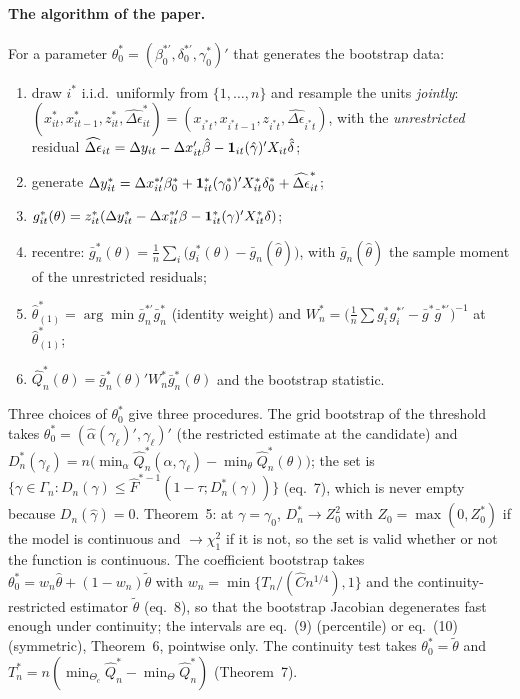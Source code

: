 \documentclass[
  10.5pt,
  a4paper,
]{article}
\begin{document}
\paragraph{The algorithm of the paper.} For a parameter $\theta^*_0=(\beta^{*\prime}_0,\delta^{*\prime}_0,\gamma^*_0)'$ that
generates the bootstrap data:
\begin{enumerate}
\item draw $i^*$ i.i.d.\ uniformly from $\{1,\dots,n\}$ and resample the units \emph{jointly}:
$(x^*_{it},x^*_{it-1},z^*_{it},\widehat{\Delta\epsilon}^*_{it})=(x_{i^*t},x_{i^*t-1},z_{i^*t},\widehat{\Delta\epsilon}_{i^*t})$,
with the \emph{unrestricted} residual $\widehat{\Delta\epsilon}_{it}=\Delta y_{it}-\Delta x_{it}'\hat\beta-\mathbf{1}_{it}(\hat\gamma)'X_{it}\hat\delta$;
\item generate $\Delta y^*_{it}=\Delta x^{*\prime}_{it}\beta^*_0+\mathbf{1}^*_{it}(\gamma^*_0)'X^*_{it}\delta^*_0+\widehat{\Delta\epsilon}^*_{it}$;
\item $g^*_{it}(\theta)=z^*_{it}(\Delta y^*_{it}-\Delta x^{*\prime}_{it}\beta-\mathbf{1}^*_{it}(\gamma)'X^*_{it}\delta)$;
\item recentre: $\bar g^*_n(\theta)=\frac1n\sum_i\bigl(g^*_i(\theta)-\bar g_n(\hat\theta)\bigr)$, with
$\bar g_n(\hat\theta)$ the sample moment of the unrestricted residuals;
\item $\hat\theta^*_{(1)}=\arg\min\bar g^{*\prime}_n\bar g^*_n$ (identity weight) and
$W^*_n=\bigl(\frac1n\sum g^*_ig^{*\prime}_i-\bar g^*\bar g^{*\prime}\bigr)^{-1}$ at $\hat\theta^*_{(1)}$;
\item $\hat Q^*_n(\theta)=\bar g^*_n(\theta)'W^*_n\bar g^*_n(\theta)$ and the bootstrap statistic.
\end{enumerate}
Three choices of $\theta^*_0$ give three procedures. The grid bootstrap of the threshold takes
$\theta^*_0=(\hat\alpha(\gamma_\ell)',\gamma_\ell)'$ (the restricted estimate at the candidate) and
$D^*_n(\gamma_\ell)=n\bigl(\min_\alpha\hat Q^*_n(\alpha,\gamma_\ell)-\min_\theta\hat Q^*_n(\theta)\bigr)$;
the set is $\{\gamma\in\Gamma_n:D_n(\gamma)\le\hat F^{*-1}(1-\tau;D^*_n(\gamma))\}$ (eq.~7), which is never empty because
$D_n(\hat\gamma)=0$. Theorem~5: at $\gamma=\gamma_0$, $D^*_n\to Z_0^2$ with $Z_0=\max(0,Z^*_0)$ if the model is continuous and
$\to\chi^2_1$ if it is not, so the set is valid whether or not the function is continuous. The coefficient
bootstrap takes $\theta^*_0=w_n\hat\theta+(1-w_n)\tilde\theta$ with $w_n=\min\{T_n/(\hat Cn^{1/4}),1\}$ and the
continuity-restricted estimator $\tilde\theta$ (eq.~8), so that the bootstrap Jacobian degenerates fast enough
under continuity; the intervals are eq.~(9) (percentile) or eq.~(10) (symmetric), Theorem~6, pointwise only. The continuity test
takes $\theta^*_0=\tilde\theta$ and $T^*_n=n(\min_{\Theta_c}\hat Q^*_n-\min_\Theta\hat Q^*_n)$ (Theorem~7).
\end{document}
